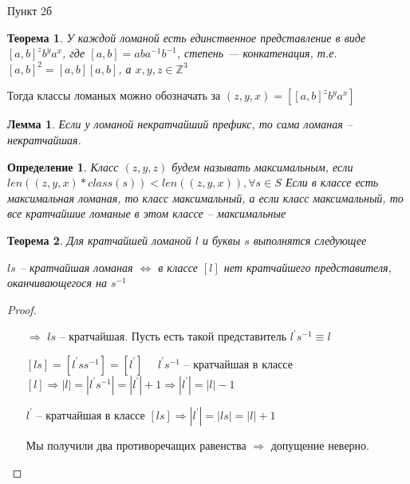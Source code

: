 \documentclass[serif, ucs]{beamer}
\newtheorem{Def}{Определение}[section]
\newtheorem{Th}{Теорема}[section]
\newtheorem{Lm}{Лемма}[section]
\newcommand{\p}[1]{#1^{\prime}}
\begin{document}
\begin{frame}{Пункт 2б}
\begin{footnotesize}
\begin{Th}
	У каждой ломаной есть единственное представление в виде $[a, b]^zb^ya^x$, где $[a, b] = aba^{-1}b^{-1}$, степень --- конкатенация, т.е. $[a, b]^2 = [a, b][a, b]$, а $x, y, z\in\mathds{Z}^3$
\end{Th}

Тогда классы ломаных можно обозначать за $(z, y, x) = [[a, b]^zb^ya^x]$

\begin{Lm}
	Если у ломаной некратчайший префикс, то сама ломаная -- некратчайшая.
\end{Lm}
\begin{Def}
	Класс $(z, y, z)$ будем называть максимальным, если $len((z, y, x)*class(s))<len((z, y, x)) , \forall s\in S$
	Если в классе есть максимальная ломаная, то класс максимальный, а если класс максимальный, то все кратчайшие ломаные в этом классе -- максимальные
\end{Def}
\end{footnotesize}
\end{frame}
\begin{frame}{}
\begin{footnotesize}
\begin{Th}
	Для кратчайшей ломаной $l$ и буквы $s$ выполнятся следующее 
	
	$ls$ -- кратчайшая ломаная $\Longleftrightarrow$ в классе $[l]$ нет кратчайшего представителя, оканчивающегося на $s^{-1}$ 
\end{Th}
\begin{proof}
	\begin{itemize}
		\item[$\Rightarrow$] $ls$ -- кратчайшая. Пусть есть такой представитель $\p ls^{-1}\equiv l$
		
		$[ls] = [\p l s s^{-1}] = [\p l]$ $\quad \p ls^{-1}$ -- кратчайшая в классе $[l]\Rightarrow |l|=|\p l s^{-1}| = |\p l| + 1\Rightarrow |\p l| = |l|-1$
		
		$\p l$ -- кратчайшая в классе $[ls]\Rightarrow |\p l | = |ls| = |l| + 1$
		
		Мы получили два противоречащих равенства $\Rightarrow $ допущение неверно.
	\end{itemize}
\end{proof}
\end{footnotesize}
\end{frame}
\end{document}
